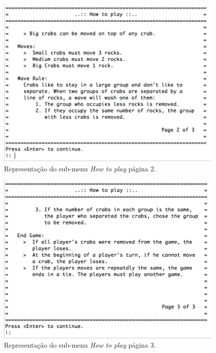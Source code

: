 \documentclass[a4paper]{article}
\begin{document}
\begin{figure}[!ht]
	\begin{center}
	\includegraphics[scale=0.4]{img/how_to_play_2.png}
	\caption{Representação do sub-menu \textit{How to play} página 2.}
    \label{Fig:how_to_play_2}
	\end{center}
\end{figure}

\begin{figure}[!ht]
	\begin{center}
	\includegraphics[scale=0.4]{img/how_to_play_3.png}
	\caption{Representação do sub-menu \textit{How to play} página 3.}
    \label{Fig:how_to_play_3}
	\end{center}
\end{figure}
\end{document}
